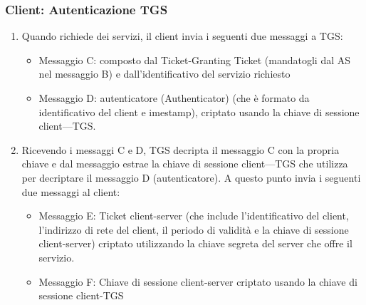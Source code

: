 \subsubsection{Client: Autenticazione TGS}
\begin{enumerate}
    \item Quando richiede dei servizi, il client invia i seguenti due messaggi a TGS:
    \begin{itemize}
        \item Messaggio C: composto dal Ticket-Granting Ticket (mandatogli dal AS nel messaggio B) e dall'identificativo del servizio richiesto
        
        \item Messaggio D: autenticatore (Authenticator) (che è formato da identificativo del client e imestamp), criptato usando la chiave di sessione client—TGS.
    \end{itemize}
    \item Ricevendo i messaggi C e D, TGS decripta il messaggio C con la propria chiave e dal messaggio estrae la chiave di sessione client—TGS che utilizza per decriptare il messaggio D (autenticatore). A questo punto invia i seguenti due messaggi al client:
    \begin{itemize}
        \item Messaggio E: Ticket client-server (che include l'identificativo del client, l'indirizzo di rete del client, il periodo di validità e la chiave di sessione client-server) criptato utilizzando la chiave segreta del server che offre il servizio.
        
        \item Messaggio F: Chiave di sessione client-server criptato usando la chiave di sessione client-TGS
    \end{itemize}
\end{enumerate}
